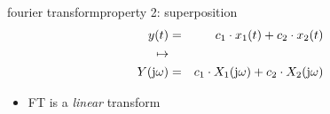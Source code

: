         \begin{frame}{fourier transform}{property 2: superposition}
            \begin{eqnarray*}
                y(t) &=& c_1\cdot x_1(t) + c_2\cdot x_2(t)\nonumber\\
                \mapsto&&\nonumber\\
                Y(\mathrm{j}\omega) &=& c_1\cdot X_1(\mathrm{j}\omega) + c_2\cdot X_2(\mathrm{j}\omega)\nonumber
            \end{eqnarray*}
            \bigskip
            \begin{itemize}
                \item<2->   FT is a \textit{linear }transform
            \end{itemize}
            
        \end{frame}	


